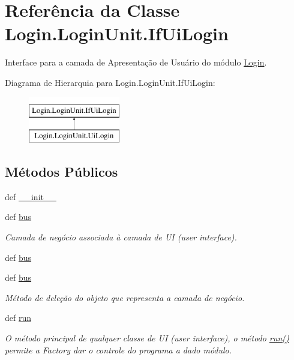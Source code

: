 \hypertarget{classLogin_1_1LoginUnit_1_1IfUiLogin}{\section{Referência da Classe Login.\-Login\-Unit.\-If\-Ui\-Login}
\label{d9/d56/classLogin_1_1LoginUnit_1_1IfUiLogin}
}


Interface para a camada de Apresentação de Usuário do módulo \hyperlink{namespaceLogin}{Login}.  


Diagrama de Hierarquia para Login.\-Login\-Unit.\-If\-Ui\-Login\-:\begin{figure}[H]
\begin{center}
\leavevmode
\includegraphics[height=2.000000cm]{d9/d56/classLogin_1_1LoginUnit_1_1IfUiLogin}
\end{center}
\end{figure}
\subsection*{Métodos Públicos}
\begin{DoxyCompactItemize}
\item 
def \hyperlink{classLogin_1_1LoginUnit_1_1IfUiLogin_a2afcef7056181566ac0e801ad8094ece}{\-\_\-\-\_\-init\-\_\-\-\_\-}
\item 
def \hyperlink{classLogin_1_1LoginUnit_1_1IfUiLogin_abab63bd2085f485ca82494db8eb5f520}{bus}
\begin{DoxyCompactList}\small\item\em Camada de negócio associada à camada de U\-I (user interface). \end{DoxyCompactList}\item 
def \hyperlink{classLogin_1_1LoginUnit_1_1IfUiLogin_abab63bd2085f485ca82494db8eb5f520}{bus}
\item 
def \hyperlink{classLogin_1_1LoginUnit_1_1IfUiLogin_abab63bd2085f485ca82494db8eb5f520}{bus}
\begin{DoxyCompactList}\small\item\em Método de deleção do objeto que representa a camada de negócio. \end{DoxyCompactList}\item 
def \hyperlink{classLogin_1_1LoginUnit_1_1IfUiLogin_ac6250c19afa63158907c6e8b4ff6dbd5}{run}
\begin{DoxyCompactList}\small\item\em O método principal de qualquer classe de U\-I (user interface), o método \hyperlink{classLogin_1_1LoginUnit_1_1IfUiLogin_ac6250c19afa63158907c6e8b4ff6dbd5}{run()} permite a Factory dar o controle do programa a dado módulo. \end{DoxyCompactList}\end{DoxyCompactItemize}

